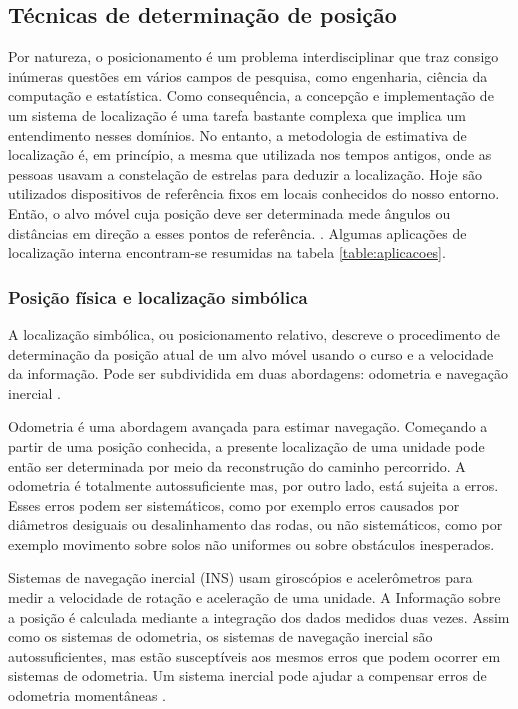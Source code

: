 \subsection{Técnicas de determinação de posição}\label{sec:determ-posic}
Por natureza, o posicionamento é um problema interdisciplinar que traz consigo inúmeras questões em vários campos de pesquisa, como engenharia, ciência da computação e estatística. Como consequência, a concepção e implementação de um sistema de localização é uma tarefa bastante complexa que implica um entendimento nesses domínios. No entanto, a metodologia de estimativa de localização é, em princípio, a mesma que utilizada nos tempos antigos, onde as pessoas usavam a constelação de estrelas para deduzir a localização. Hoje são utilizados dispositivos de referência fixos em locais conhecidos do nosso entorno. Então, o alvo móvel cuja posição deve ser determinada mede ângulos ou distâncias em direção a esses pontos de referência. \cite{linde2006aspects}. Algumas aplicações de localização interna encontram-se resumidas na tabela \ref{table:aplicacoes}.


\subsubsection{Posição física e localização simbólica}\label{sec:posic-fisica}
A localização simbólica, ou posicionamento relativo, descreve o procedimento de determinação da posição atual de um alvo móvel usando o curso e a velocidade da informação. Pode ser subdividida em duas abordagens: odometria e navegação inercial \cite{linde2006aspects}.

Odometria é uma abordagem avançada para estimar navegação. Começando a partir de uma posição conhecida, a presente localização de uma unidade pode então ser determinada por meio da reconstrução do caminho percorrido. A odometria é totalmente autossuficiente mas, por outro lado, está sujeita a erros. Esses erros podem ser sistemáticos, como por exemplo erros causados por diâmetros desiguais ou desalinhamento das rodas, ou não sistemáticos, como por exemplo movimento sobre solos não uniformes ou sobre obstáculos inesperados. 

Sistemas de navegação inercial (INS) usam giroscópios e acelerômetros para medir a velocidade de rotação e aceleração de uma unidade. A Informação sobre a posição é calculada mediante a integração dos dados medidos duas vezes. Assim como os sistemas de odometria, os sistemas de navegação inercial são autossuficientes, mas estão susceptíveis aos mesmos erros que podem ocorrer em sistemas de odometria. Um sistema inercial pode ajudar a compensar erros de odometria momentâneas \cite{linde2006aspects}.

